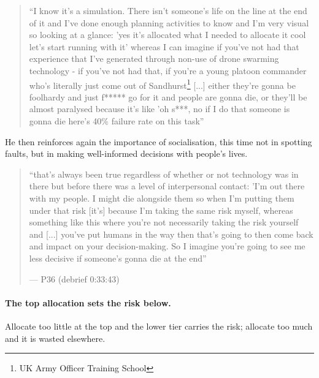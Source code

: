 \begin{quote}\small
``I know it's a simulation. There isn't someone's life on the line at the end of it and I've done enough planning activities to know and I'm very visual so looking at a glance: 'yes it's allocated what I needed to allocate it cool let's start running with it' whereas I can imagine if you've not had that experience that I've generated through non-use of drone swarming technology - if you've not had that, if you're a young platoon commander who's literally just come out of Sandhurst\footnote{UK Army Officer Training School} [...] either they're gonna be foolhardy and just f***** go for it and people are gonna die, or they'll be almost paralysed because it's like 'oh s***, no if I do that someone is gonna die here's 40\% failure rate on this task''
\end{quote}

He then reinforces again the importance of socialisation, this time not in spotting faults, but in making well-informed decisions with people's lives.
\begin{quote}\small
``that's always been true regardless of whether or not technology was in there but before there was a level of interpersonal contact: 'I'm out there with my people. I might die alongside them so when I'm putting them under that risk [it's] because I'm taking the same risk myself, whereas something like this where you're not necessarily taking the risk yourself and [...] you've put humans in the way then that's going to then come back and impact on your decision-making. So I imagine you're going to see me less decisive if someone's gonna die at the end''\par\hfill--- P36 (debrief 0:33:43)
\end{quote}


\label{sec:qual:practitioner:pt-resource-cascade}\paragraph{The top allocation sets the risk below.}
Allocate too little at the top and the lower tier carries the risk; allocate too much and it is wasted elsewhere.


